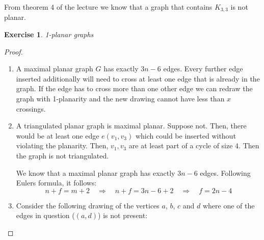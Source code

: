 \documentclass[a4paper,12pt,headsepline]{scrartcl}
\newtheorem{aufgabe}{Exercise}
\begin{document}
\begin{enumerate}[a)]
\begin{center}
    \end{center}
    From theorem 4 of the lecture we know that a graph that contains $K_{3,3}$ is not planar.
\end{enumerate}
\newpage
\begin{aufgabe}1-planar graphs
\end{aufgabe}
\begin{proof}
  \mbox{}\\
  \begin{enumerate}
    \item\label{num:x-cross} A maximal planar graph $G$ has exactly $3n-6$ edges.
      Every further edge inserted additionally will need to cross at least one edge that is already in the graph.
      If the edge has to cross more than one other edge we can redraw the graph with 1-planarity and the new drawing cannot have less than $x$ crossings.
    \item\label{num:max-plan} 
      A triangulated planar graph is maximal planar. Suppose not. Then, there would be at least one edge $e (v_1,v_3)$ which could be inserted without violating the planarity.
      Then, $v_1,v_3$ are at least part of a cycle of size $4$.
      Then the graph is not triangulated.

      We know that a maximal planar graph has exactly $3n-6$ edges.
      Following Eulers formula, it follows:
      \[ n + f = m + 2 \quad\Rightarrow\quad n + f = 3n - 6 + 2 \quad\Rightarrow\quad f= 2n - 4 \]
    \item\label{num:closed} Consider the following drawing of the vertices $a$, $b$, $c$ and $d$ where one of the edges in question ($(a,d)$) is not present:
      \begin{center}
\end{center}
\end{enumerate}
\end{proof}
\end{document}
